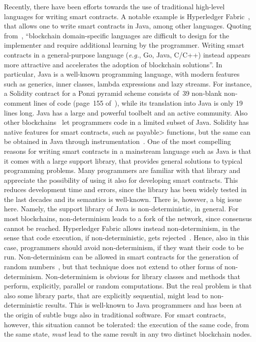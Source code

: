 Recently, there have been efforts towards the use of traditional
high-level languages for writing smart contracts.
A notable example is Hyperledger Fabric~\cite{AndroulakiBBCCC18,Vukolic17}, that allows one
to write smart contracts in Java, among other languages. Quoting from~\cite{AndroulakiBBCCC18},
``blockchain domain-specific languages are difficult to design for the implementer
and require additional learning by the programmer. Writing smart contracts
in a general-purpose language (\emph{e.g.}, Go, Java, C/C++) instead
appears more attractive and accelerates the adoption of blockchain solutions''.
In particular, Java is a well-known programming language,
with modern features such as generics, inner classes, lambda
expressions and lazy streams. For instance, a Solidity contract
for a Ponzi pyramid scheme consists of~39 non-blank non-comment lines of code
(page~155 of~\cite{IyerD18}), while its translation into Java is only 19 lines
long. %
Java has a large and powerful toolbelt and an active community.
Also other blockchains~\cite{aion_example_contract,neo_contract,Spoto19}
let programmers code in a limited subset of Java.
Solidity has native features for smart contracts, such as
\<payable> functions, but the same can be obtained in Java through instrumentation~\cite{Spoto19}.
%
One of the most compelling reasons for writing smart contracts
in a mainstream language such as Java is that it comes with a large
support library, that provides general solutions to typical programming problems.
Many programmers are familiar with that library and appreciate the possibility
of using it also for developing smart contracts. This reduces
development time and errors, since the library has been widely tested
in the last decades and its semantics is well-known. There is, however, a big
issue here. Namely, the support library of Java is non-deterministic, in general.
For most blockchains, non-determinism leads to a fork of the network, since
consensus cannot be reached. Hyperledger Fabric allows instead non-determinism,
in the sense that code execution, if non-deterministic, gets rejected~\cite{Vukolic17}.
Hence, also in this case, programmers should avoid non-determinism, if they want their code to be run.
Non-determinism can be allowed in smart contracts for the generation of random numbers~\cite{ChatterjeeGP19}, but that
technique does not extend to other forms of non-determinism.
%
Non-determinism is obvious for library classes and methods that perform, explicitly,
parallel or random computations. But the real problem is that
also some library parts, that are explicitly sequential, might lead to
non-deterministic results.
This is well-known to Java programmers and has been at the origin of subtle
bugs also in traditional software. For smart contracts, however,
this situation cannot be tolerated: the execution of the same code, from the same state,
\emph{must} lead to the same result in any two distinct blockchain nodes.

